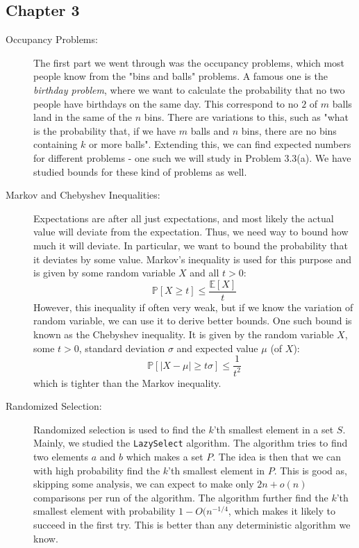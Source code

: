 \documentclass[a4paper]{article}
\begin{document}
\begin{description}
\subsection*{Chapter 3}
\begin{description}
  \item[Occupancy Problems:]
The first part we went through was the occupancy problems, which most people know from the "bins and balls" problems. A famous one is the \textit{birthday problem}, where we want to calculate the probability that no two people have birthdays on the same day. This correspond to no $2$ of $m$ balls land in the same of the $n$ bins. There are variations to this, such as "what is the probability that, if we have $m$ balls and $n$ bins, there are no bins containing $k$ or more balls". Extending this, we can find expected numbers for different problems - one such we will study in Problem 3.3(a). We have studied bounds for these kind of problems as well. \\
  \item[Markov and Chebyshev Inequalities:]
    Expectations are after all just expectations, and most likely the actual value will deviate from the expectation. Thus, we need way to bound how much it will deviate. In particular, we want to bound the probability that it deviates by some value. Markov's inequality is used for this purpose and is given by some random variable $X$  and all $t>0$:
    $$
    \mathbb{P}\left[ X \geq t \right]\leq \frac{\mathbb{E}[X]}{t}
    $$
    However, this inequality if often very weak, but if we know the variation of random variable, we can use it to derive better bounds. One such bound is known as the Chebyshev inequality. It is given by the random variable $X$, some $t>0$, standard deviation $\sigma$ and expected value $\mu$ (of $X$):
    $$
    \mathbb{P}\left[ |X-\mu|\geq t \sigma\right] \leq \frac{1}{t^2}
    $$
    which is tighter than the Markov inequality. \\
  \item[Randomized Selection:]
    Randomized selection is used to find the $k$'th smallest element in a set $S$. Mainly, we studied the \texttt{LazySelect} algorithm. The algorithm tries to find two elements $a$ and $b$ which makes a set $P$. The idea is then that we can with high probability find the $k$'th smallest element in $P$. This is good as, skipping some analysis, we can expect to make only $2n+o(n)$ comparisons per run of the algorithm. The algorithm further find the $k$'th smallest element with probability $1-O(n^{-1/4}$, which makes it likely to succeed in the first try. This is better than any deterministic algorithm we know.
\end{description}


\end{description}
\end{document}
